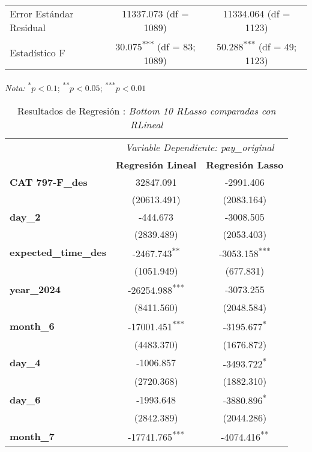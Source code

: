 \documentclass{article}
\begin{document}
\begin{table}[h!]
\begin{threeparttable}
\begin{tabular}{@{}lcc@{}}
Error Estándar Residual & 11337.073 (df = 1089) & 11334.064 (df = 1123) \\
Estadístico F & 30.075\textsuperscript{***} (df = 83; 1089) & 50.288\textsuperscript{***} (df = 49; 1123) \\
\bottomrule
\end{tabular}
\begin{tablenotes}
\item \textit{Nota:} \textsuperscript{*}$p<0.1$; \textsuperscript{**}$p<0.05$; \textsuperscript{***}$p<0.01$
\end{tablenotes}
\end{threeparttable}
\end{table}

\begin{table}[h!]
\centering
\caption{Resultados de Regresión : \textit {Bottom 10 RLasso comparadas con RLineal}}
\begin{threeparttable}
\begin{tabular}{@{}lcc@{}}
\toprule
 & \multicolumn{2}{c}{\textit{Variable Dependiente: pay\_original}} \\
\cmidrule(lr){2-3}
 & \textbf{Regresión Lineal} & \textbf{Regresión Lasso} \\
\midrule
\textbf{CAT 797-F\_des} & 32847.091 & -2991.406 \\
 & (20613.491) & (2083.164) \\
\textbf{day\_2} & -444.673 & -3008.505 \\
 & (2839.489) & (2053.403) \\
\textbf{expected\_time\_des} & -2467.743\textsuperscript{**} & -3053.158\textsuperscript{***} \\
 & (1051.949) & (677.831) \\
\textbf{year\_2024} & -26254.988\textsuperscript{***} & -3073.255 \\
 & (8411.560) & (2048.584) \\
\textbf{month\_6} & -17001.451\textsuperscript{***} & -3195.677\textsuperscript{*} \\
 & (4483.370) & (1676.872) \\
\textbf{day\_4} & -1006.857 & -3493.722\textsuperscript{*} \\
 & (2720.368) & (1882.310) \\
\textbf{day\_6} & -1993.648 & -3880.896\textsuperscript{*} \\
 & (2842.389) & (2044.286) \\
\textbf{month\_7} & -17741.765\textsuperscript{***} & -4074.416\textsuperscript{**} \\

\end{tabular}
\end{threeparttable}
\end{table}
\end{document}
